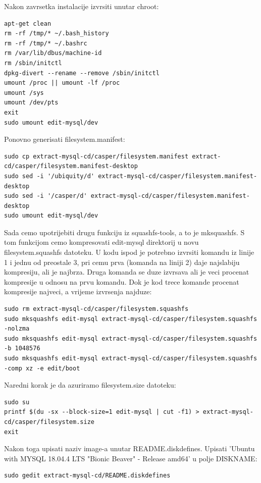 \documentclass[12pt,vi]{mitthesis}
\begin{document}
\noindent
Nakon zavrsetka instalacije izvrsiti unutar chroot:
\begin{lstlisting}[style=BashInputStyle]
apt-get clean
rm -rf /tmp/* ~/.bash_history
rm -rf /tmp/* ~/.bashrc
rm /var/lib/dbus/machine-id
rm /sbin/initctl
dpkg-divert --rename --remove /sbin/initctl
umount /proc || umount -lf /proc
umount /sys
umount /dev/pts
exit
sudo umount edit-mysql/dev
\end{lstlisting}

\noindent
Ponovno generisati filesystem.manifest:
\begin{lstlisting}[style=BashInputStyle]
sudo cp extract-mysql-cd/casper/filesystem.manifest extract-cd/casper/filesystem.manifest-desktop
sudo sed -i '/ubiquity/d' extract-mysql-cd/casper/filesystem.manifest-desktop
sudo sed -i '/casper/d' extract-mysql-cd/casper/filesystem.manifest-desktop
sudo umount edit-mysql/dev
\end{lstlisting}

\noindent
Sada cemo upotrijebiti drugu funkciju iz squashfs-tools, a to je mksquashfs. S tom funkcijom cemo kompresovati edit-mysql direktorij u novu filesystem.squashfs datoteku. U kodu ispod je potrebno izvrsiti komandu iz linije 1 i jednu od preostale 3, pri cemu prva (komanda na liniji 2) daje najslabiju kompresiju, ali je najbrza. Druga komanda se duze izvrsava ali je veci procenat kompresije u odnosu na prvu komandu. Dok je kod trece komande procenat kompresije najveci, a vrijeme izvrsenja najduze:
\begin{lstlisting}[style=BashInputStyle]
sudo rm extract-mysql-cd/casper/filesystem.squashfs
sudo mksquashfs edit-mysql extract-mysql-cd/casper/filesystem.squashfs -nolzma 
sudo mksquashfs edit-mysql extract-mysql-cd/casper/filesystem.squashfs -b 1048576
sudo mksquashfs edit-mysql extract-mysql-cd/casper/filesystem.squashfs -comp xz -e edit/boot
\end{lstlisting}

\noindent
Naredni korak je da azuriramo filesystem.size datoteku:
\begin{lstlisting}[style=BashInputStyle]
sudo su
printf $(du -sx --block-size=1 edit-mysql | cut -f1) > extract-mysql-cd/casper/filesystem.size
exit
\end{lstlisting}

\noindent
Nakon toga upisati naziv image-a unutar README.diskdefines. 
Upisati 'Ubuntu with MYSQL 18.04.4 LTS "Bionic Beaver" - Release amd64' u polje DISKNAME:
\begin{lstlisting}[style=BashInputStyle]
sudo gedit extract-mysql-cd/README.diskdefines
\end{lstlisting}
\end{document}
